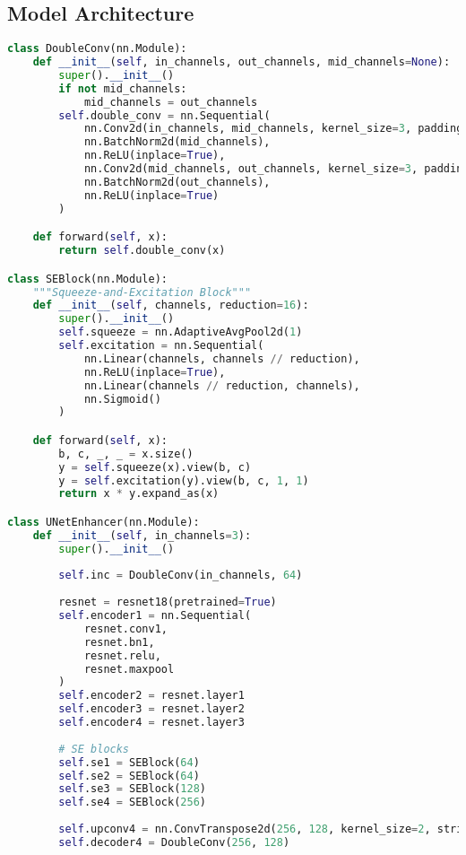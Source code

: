 \documentclass{apmcmthesis}
\begin{document}
\subsection{Model Architecture}
\begin{lstlisting}[language=python,caption={Deep Learning Model Architecture}]
    class DoubleConv(nn.Module):
    def __init__(self, in_channels, out_channels, mid_channels=None):
        super().__init__()
        if not mid_channels:
            mid_channels = out_channels
        self.double_conv = nn.Sequential(
            nn.Conv2d(in_channels, mid_channels, kernel_size=3, padding=1),
            nn.BatchNorm2d(mid_channels),
            nn.ReLU(inplace=True),
            nn.Conv2d(mid_channels, out_channels, kernel_size=3, padding=1),
            nn.BatchNorm2d(out_channels),
            nn.ReLU(inplace=True)
        )

    def forward(self, x):
        return self.double_conv(x)

class SEBlock(nn.Module):
    """Squeeze-and-Excitation Block"""
    def __init__(self, channels, reduction=16):
        super().__init__()
        self.squeeze = nn.AdaptiveAvgPool2d(1)
        self.excitation = nn.Sequential(
            nn.Linear(channels, channels // reduction),
            nn.ReLU(inplace=True),
            nn.Linear(channels // reduction, channels),
            nn.Sigmoid()
        )

    def forward(self, x):
        b, c, _, _ = x.size()
        y = self.squeeze(x).view(b, c)
        y = self.excitation(y).view(b, c, 1, 1)
        return x * y.expand_as(x)

class UNetEnhancer(nn.Module):
    def __init__(self, in_channels=3):
        super().__init__()
        
        self.inc = DoubleConv(in_channels, 64)
        
        resnet = resnet18(pretrained=True)
        self.encoder1 = nn.Sequential(
            resnet.conv1,
            resnet.bn1,
            resnet.relu,
            resnet.maxpool
        )
        self.encoder2 = resnet.layer1
        self.encoder3 = resnet.layer2
        self.encoder4 = resnet.layer3
        
        # SE blocks
        self.se1 = SEBlock(64)
        self.se2 = SEBlock(64)
        self.se3 = SEBlock(128)
        self.se4 = SEBlock(256)
        
        self.upconv4 = nn.ConvTranspose2d(256, 128, kernel_size=2, stride=2)
        self.decoder4 = DoubleConv(256, 128)
        

\end{lstlisting}
\end{document}

